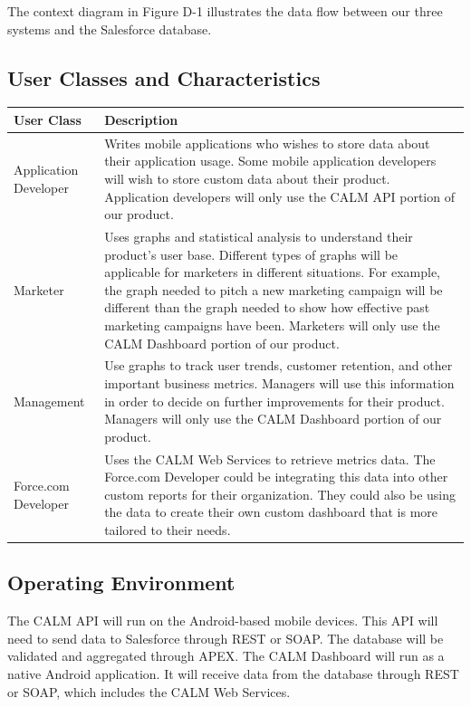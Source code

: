 \documentclass[12pt,oneside,letterpaper]{article}
\begin{document}
\vspace{0.25in}
The context diagram in Figure D-1 illustrates the data flow between 
our three systems and the Salesforce database.\\

\subsection{User Classes and Characteristics}
\begin{longtable}{|l|p{3.8in}|}
\hline
\textbf{User Class}&\textbf{Description}\\
\hline
Application Developer&Writes mobile applications who wishes to store 
data about their application usage. Some mobile application developers 
will wish to store custom data about their product. Application 
developers will only use the CALM API portion of our product.\\
\hline
Marketer&Uses graphs and statistical analysis to understand their 
product's user base. Different types of graphs will be applicable for 
marketers in different situations. For example, the graph needed to 
pitch a new marketing campaign will be different than the graph needed 
to show how effective past marketing campaigns have been. Marketers 
will only use the CALM Dashboard portion of our product.\\
\hline
Management&Use graphs to track user trends, customer retention, and 
other important business metrics. Managers will use this information 
in order to decide on further improvements for their product. Managers 
will only use the CALM Dashboard portion of our product.\\
\hline
Force.com Developer&Uses the CALM Web Services to retrieve metrics 
data. The Force.com Developer could be integrating this data into other 
custom reports for their organization. They could also be using the data 
to create their own custom dashboard that is more tailored to their needs.\\
\hline
\end{longtable}

\subsection{Operating Environment}
The CALM API will run on the Android-based mobile devices. This API 
will need to send data to Salesforce through REST or SOAP. The database will 
be validated and aggregated through APEX. The CALM Dashboard will run as a native Android application. 
It will receive data from the database through REST or SOAP, which includes the CALM Web Services.
\end{document}
